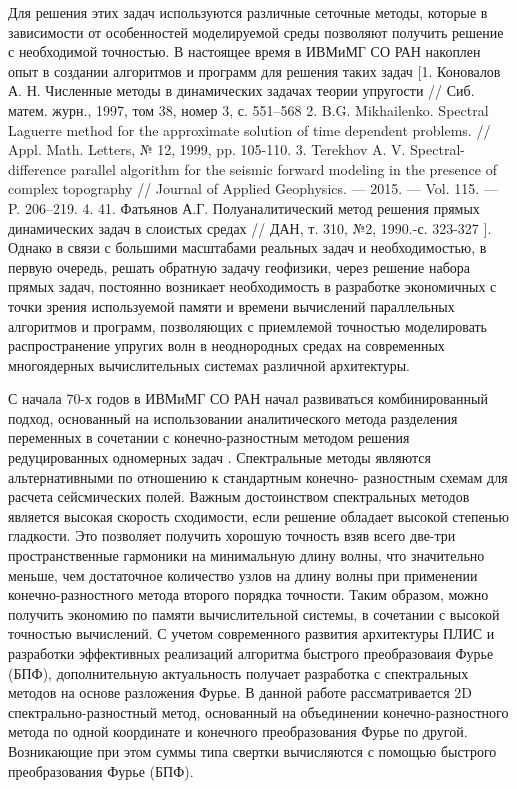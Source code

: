 Для решения этих задач используются различные сеточные методы,  которые в зависимости от особенностей моделируемой среды позволяют получить решение с необходимой точностью.
В настоящее время в ИВМиМГ СО РАН накоплен опыт в создании алгоритмов и программ для решения таких задач [1. Коновалов А. Н. Численные методы в динамических задачах теории упругости // Сиб. матем. журн., 1997, том 38, номер 3, с. 551–568
2. B.G. Mikhailenko. Spectral Laguerre method for the approximate solution of time dependent problems. // Appl. Math. Letters, № 12, 1999, pp. 105-110.
3. Terekhov A. V. Spectral-difference parallel algorithm for the seismic forward
modeling in the presence of complex topography // Journal of Applied Geophysics.
–– 2015. –– Vol. 115. –– P. 206–219.
4. 41. Фатьянов А.Г. Полуаналитический метод решения прямых динамических задач в слоистых средах // ДАН, т. 310, №2, 1990.-с. 323-327 ].
Однако в связи с большими масштабами реальных задач и необходимостью, в первую очередь, решать обратную
задачу геофизики, через решение набора прямых задач, постоянно возникает необходимость в
разработке экономичных с точки зрения используемой памяти и времени вычислений
параллельных алгоритмов и программ, позволяющих с приемлемой точностью
моделировать распространение упругих волн в неоднородных средах на 
современных многоядерных вычислительных системах различной архитектуры.

С начала 70-х годов в ИВМиМГ СО РАН начал развиваться комбинированный подход, основанный на использовании аналитического метода разделения переменных в сочетании с конечно-разностным методом решения редуцированных одномерных задач \cite{alex}. Спектральные методы являются альтернативными по отношению к стандартным конечно-
разностным схемам для расчета сейсмических полей. Важным достоинством
спектральных методов является высокая скорость сходимости, если решение обладает
высокой степенью гладкости. Это позволяет получить хорошую точность взяв всего две-три
пространственные гармоники на минимальную длину волны, что значительно меньше, 
чем достаточное количество узлов на длину волны при применении конечно-разностного метода второго порядка точности.
Таким образом, можно получить экономию по памяти вычислительной системы, в сочетании с высокой точностью вычислений.
С учетом современного развития архитектуры ПЛИС и разработки эффективных реализаций алгоритма быстрого преобразоваия Фурье (БПФ), дополнительную актуальность получает разработка с спектральных методов на основе разложения Фурье.
В данной работе рассматривается 2D спектрально-разностный метод, основанный на
объединении конечно-разностного метода по одной координате и конечного
преобразования Фурье по другой. Возникающие при этом суммы
типа свертки вычисляются с помощью быстрого преобразования Фурье (БПФ).

